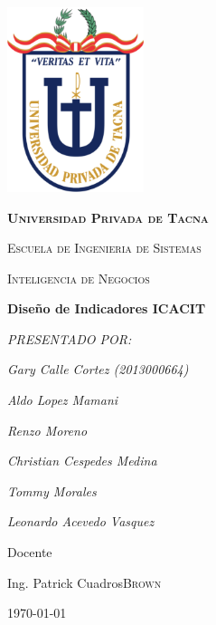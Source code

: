 \documentclass[12pt,a4paper]{report}
\begin{document}
\begin{titlepage}
	\centering
	\includegraphics[width=4cm]{./images/upt}\par\vspace{1cm}
	{\scshape\LARGE\huge\bfseries Universidad Privada de Tacna \par}
	{\scshape\LARGE Escuela de Ingenieria de Sistemas \par}
	\vspace{1cm}
	{\scshape\Large Inteligencia de Negocios\par}
	\vspace{0.5cm}
	{\huge\bfseries Diseño de Indicadores ICACIT\par}
	\vspace{1cm}

	{\Large\itshape PRESENTADO POR:\par}
	{\Large\itshape Gary Calle Cortez (2013000664)\par}
	{\Large\itshape Aldo Lopez Mamani\par}
	{\Large\itshape Renzo Moreno\par}
	{\Large\itshape Christian Cespedes Medina\par}
	{\Large\itshape Tommy Morales\par}
	{\Large\itshape Leonardo Acevedo Vasquez\par}

	\vfill
	Docente\par
	Ing. Patrick Cuadros\textsc{Brown}

	\vfill

	{\large \today\par}

\end{titlepage}

\begin{abstract}
El siguiente informe trata sobre los criterios de ICACIT estableciendo los indicadores para Condicion o Criterio ,determinacion de el Área Responsable de los indicadores y una posible consulta en SQL que ingeste este indicador.
\end{abstract}
\end{document}

